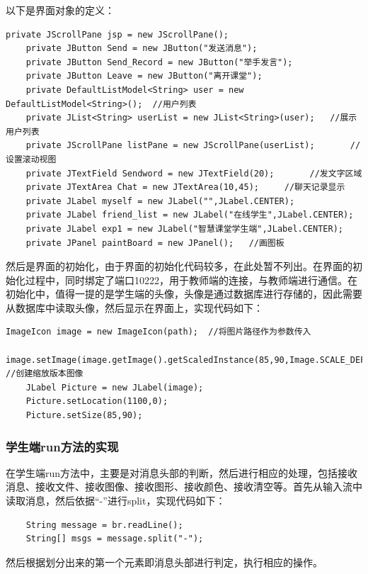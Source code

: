 \documentclass[UTF8,12pt]{article}
\begin{document}
以下是界面对象的定义：
\begin{lstlisting}[title=界面对象的定义,frame=shadowbox]
    private JScrollPane jsp = new JScrollPane();
    private JButton Send = new JButton("发送消息");
    private JButton Send_Record = new JButton("举手发言");
    private JButton Leave = new JButton("离开课堂");
    private DefaultListModel<String> user = new DefaultListModel<String>();  //用户列表
    private JList<String> userList = new JList<String>(user);   //展示用户列表
    private JScrollPane listPane = new JScrollPane(userList);       //设置滚动视图
    private JTextField Sendword = new JTextField(20);       //发文字区域
    private JTextArea Chat = new JTextArea(10,45);     //聊天记录显示
    private JLabel myself = new JLabel("",JLabel.CENTER);
    private JLabel friend_list = new JLabel("在线学生",JLabel.CENTER);
    private JLabel exp1 = new JLabel("智慧课堂学生端",JLabel.CENTER);
    private JPanel paintBoard = new JPanel();   //画图板
\end{lstlisting}

然后是界面的初始化，由于界面的初始化代码较多，在此处暂不列出。在界面的初始化过程中，同时绑定了端口10222，用于教师端的连接，与教师端进行通信。在初始化中，值得一提的是学生端的头像，头像是通过数据库进行存储的，因此需要从数据库中读取头像，然后显示在界面上，实现代码如下：

\begin{lstlisting}[title=学生端的头像,frame=shadowbox]
    ImageIcon image = new ImageIcon(path);  //将图片路径作为参数传入
    image.setImage(image.getImage().getScaledInstance(85,90,Image.SCALE_DEFAULT));  //创建缩放版本图像
    JLabel Picture = new JLabel(image);
    Picture.setLocation(1100,0);
    Picture.setSize(85,90);
\end{lstlisting}

\subsubsection{学生端run方法的实现}
在学生端run方法中，主要是对消息头部的判断，然后进行相应的处理，包括接收消息、接收文件、接收图像、接收图形、接收颜色、接收清空等。首先从输入流中读取消息，然后依据“-”进行split，实现代码如下：

\begin{lstlisting}
    String message = br.readLine();
    String[] msgs = message.split("-");
\end{lstlisting}

然后根据划分出来的第一个元素即消息头部进行判定，执行相应的操作。
\end{document}
